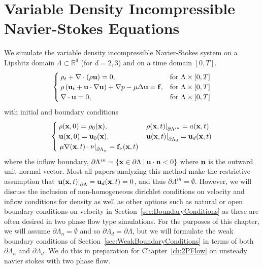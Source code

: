 \documentclass[letterpaper]{erdc}
\begin{document}
\chapter{Variable Density Incompressible Navier-Stokes Equations}\label{ch:vardensity_navierstokes_description}
We simulate the variable density incompressible Navier-Stokes system on a Lipshitz domain $\Lambda\subset \mathbb{R}^d$ (for $d=2,3$) and on a time domain $[0,T]$.
\begin{equation}\label{eqn:variabledensityNavierStokes}
  \begin{cases}
    \rho_t + \nabla\cdot\left( \rho \textbf{u}\right) = 0, & \mbox{for }\Lambda\times[0,T]\\
    \rho\left(\textbf{u}_t + \textbf{u}\cdot\nabla\textbf{u}  \right) + \nabla p - \mu\Delta \textbf{u} = \mathbf{f}, &\mbox{for }\Lambda\times[0,T]\\
    \nabla\cdot \textbf{u} = 0, &\mbox{for } \Lambda\times[0,T]
  \end{cases}
\end{equation}
with initial and boundary conditions
\begin{equation}\label{eqn:variabledensityNavierStokesBCIC}
  \begin{cases}
    \rho(\textbf{x},0) = \rho_0(\textbf{x}), & \left.\rho(\textbf{x},t)\right|_{\partial\Lambda^{in}} = a(\textbf{x},t)\\
    \textbf{u}(\textbf{x},0) = \textbf{u}_0(\textbf{x}), & \left.\textbf{u}(\textbf{x},t)\right|_{\partial\Lambda_d} = \textbf{u}_d(\textbf{x},t)\\
    \left.\mu\nabla(\textbf{x},t)\cdot\nu\right|_{\partial\Lambda_n} = \mathbf{f}_{\nu}(\textbf{x},t) 
  \end{cases}
\end{equation}
where the inflow boundary, $\partial\Lambda^{in} = \{ \textbf{x}\in \partial\Lambda \:|\: \textbf{u}\cdot\textbf{n} <0 \}$ where $\textbf{n}$ is the outward unit normal vector.  Most all papers analyzing this method make the restrictive assumption that $\left.\textbf{u}(\textbf{x},t)\right|_{\partial\Lambda} = \textbf{u}_d(\textbf{x},t) = 0$, and thus $\partial\Lambda^{in}= \emptyset$.  However, we will discuss the inclusion of non-homogeneous dirichlet conditions on velocity and inflow conditions for density as well as other options such as natural or open boundary conditions on velocity in Section~\ref{sec:BoundaryConditions} as these are often desired in two phase flow type simulations.  For the purposes of this chapter, we will assume $\partial\Lambda_n=\emptyset$ and so $\partial\Lambda_d=\partial\Lambda$, but we will formulate the weak boundary conditions of Section~\ref{sec:WeakBoundaryConditions} in terms of both $\partial\Lambda_n$ and $\partial\Lambda_d$.  We do this in preparation for Chapter~\ref{ch:2PFlow} on unsteady navier stokes with two phase flow.
\end{document}
